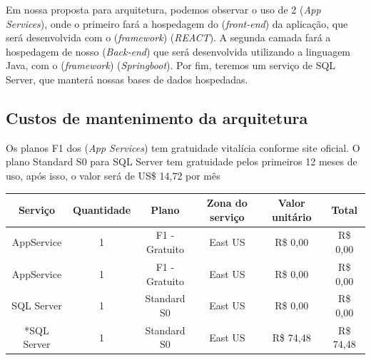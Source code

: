 \documentclass[
    12pt,               %
    openright,          %
    oneside,
    a4paper,            %
    MODELO,             %
    english,            %
    brazil              %
   ]{ifsp-spo-inf-ctds}
\begin{document}
Em nossa proposta para arquitetura, podemos observar o uso de 2 (\textit{App Services}), onde o primeiro fará a hospedagem do (\textit{front-end}) da aplicação, que será desenvolvida com o (\textit{framework}) (\textit{REACT}). A segunda camada fará a hospedagem de nosso (\textit{Back-end}) que será desenvolvida utilizando a linguagem Java, com o (\textit{framework}) (\textit{Springboot}).
Por fim, teremos um serviço de SQL Server, que manterá nossas bases de dados hospedadas.

\subsection{Custos de mantenimento da arquitetura}
Os planos F1 dos (\textit{App Services}) tem gratuidade vitalícia conforme site oficial.
O plano Standard S0 para SQL Server tem gratuidade pelos primeiros 12 meses de uso, após isso, o valor será de US\$ 14,72 por mês
\begin{table}[h]
\begin{tabular}{|c|c|c|c|c|c|}
\hline
\textbf{Serviço} & \textbf{Quantidade} & \textbf{Plano} & \textbf{Zona do serviço} & \textbf{Valor unitário} & \textbf{Total} \\ \hline
AppService & 1 & F1 - Gratuito & East US & R\$ 0,00 & R\$ 0,00 \\ \hline
AppService & 1 & F1 - Gratuito & East US & R\$ 0,00 & R\$ 0,00 \\ \hline
SQL Server & 1 & Standard S0 & East US & R\$ 0,00 & R\$ 0,00 \\ \hline
*SQL Server & 1 & Standard S0 & East US & R\$ 74,48 & R\$ 74,48 \\ \hline
\end{tabular}
\end{table}
\end{document}

